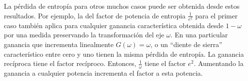La p\'erdida de entrop\'ia para otros muchos casos puede ser obtenida
desde estos resultados. Por ejemplo, la del factor de potencia de
entrop\;ia $\frac{1}{e^{2}}$ para el primer caso tambi\'en aplica para
cualquier ganancia caracter\'istica obtenida desde $1-\omega$ por una
medida preservando la transformaci\'on del eje $\omega$. En una
particular ganancia que incrementa linealmente $G \left (\omega
\right) = \omega$, o un ``diente de sierra'' caracter\'istico entre cero y
uno tienen la misma p\'erdida de entrop\'ia. La ganancia rec\'iproca
tiene el factor rec\'iproco. Entonces, $\frac{1}{\omega}$ tiene el
factor $e^{2}$. Aumentando la ganancia a cualquier potencia incrementa
el factor a esta potencia.

\clearpage
